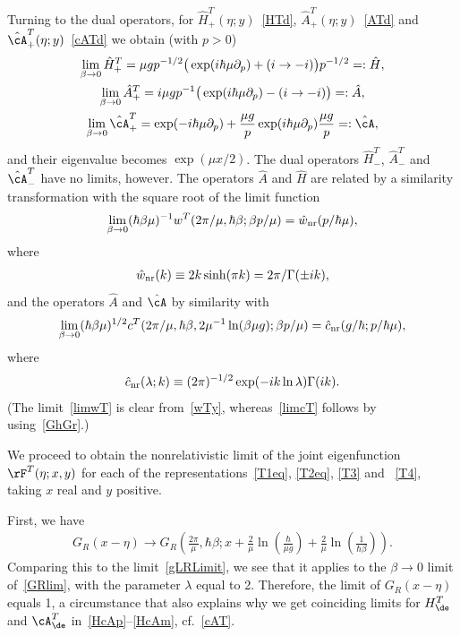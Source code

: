 \documentclass[pdftex]{sigma}
\numberwithin{equation}{section}
\begin{document}
Turning to the dual operators, for $\hat{H}^T_+(\eta;y)$~\eqref{HTd}, $\hat{A}^T_+(\eta;y)$~\eqref{ATd} and~$\hat{\cA}^T_+(\eta;y)$~\eqref{cATd} we obtain (with $p>0$)
\begin{gather}
\lim_{\beta\to 0}\hat{H}^T_+=\mu gp^{-1/2}\big(\exp(i\hbar \mu\partial_p)+(i\to -i)\big)p^{-1/2}=: \hat{H},
\\
\label{hatA}
\lim_{\beta\to 0}\hat{A}^T_+=i\mu gp^{-1}\big(\exp(i\hbar \mu\partial_p)-(i\to -i)\big)=:\hat{A},
\\
\lim_{\beta\to 0}\hat{\cA}^T_+=\exp(-i\hbar \mu\partial_p)+
\frac{\mu g}{p}
\exp(i\hbar \mu\partial_p)\frac{\mu g}{p}=:\hat{\cA},
\end{gather}
and their eigenvalue becomes $\exp(\mu x/2)$. The dual operators $\hat{H}^T_-$, $\hat{A}^T_-$ and $\hat{\cA}^T_-$ have no limits, however. The operators $\hat{A}$ and $\hat{H}$ are related by a similarity transformation with the square root of the limit function
\begin{gather}\label{limwT}
 \lim_{\beta \to 0}(\hbar\beta\mu)^{-1}w^T(2\pi/\mu,\hbar\beta;\beta p/\mu)= \hat{w}_{\rm nr}(p/\hbar\mu),
 \end{gather}
 where
  \begin{gather}
 \hat{w}_{\rm nr}(k)\equiv 2k\sinh (\pi k)=2\pi/\Gamma(\pm ik),
  \end{gather}
and the operators $\hat{A}$ and $\hat{\cA}$ by similarity with
\begin{gather}\label{limcT}
\lim_{\beta \to 0}(\hbar\beta\mu)^{1/2}c^T(2\pi/\mu,\hbar\beta,2\mu^{-1}\ln(\beta\mu g);\beta p/\mu)= \hat{c}_{\rm nr}(g/\hbar;p/\hbar\mu),
 \end{gather}
where
\begin{gather}
 \hat{c}_{\rm nr}(\lambda;k)\equiv (2\pi)^{-1/2}\exp(-ik\ln \lambda)\Gamma(ik).
   \end{gather}
(The limit~\eqref{limwT} is clear from~\eqref{wTy}, whereas~\eqref{limcT} follows by using~\eqref{GhGr}.)

We proceed to obtain the nonrelativistic limit of the joint eigenfunction $\rF^T(\eta;x,y)$ for each of the representations~\eqref{T1eq}, \eqref{T2eq}, \eqref{T3} and~
\eqref{T4}, taking $x$ real and $y$ positive.

 First, we have
\begin{gather}\label{GRlim}
G_R(x-\eta)\to G_R\left(\frac{2\pi}{\mu},\hbar\beta;x+\frac{2}{\mu}\ln\left(\frac{\hbar}{\mu g}\right)
+\frac{2}{\mu}\ln\left(\frac{1}{\hbar\beta}\right)\right).
\end{gather}
Comparing this to the limit~\eqref{gLRLimit}, we see that it applies to the $\beta\to 0$ limit of~\eqref{GRlim}, with the parameter $\lambda$ equal to 2. Therefore, the limit of $G_R(x-\eta)$ equals 1, a circumstance that also explains why we get coinciding limits for $H_{\de}^T$ and $\cA_{\de}^T$ in~\eqref{HcAp}--\eqref{HcAm}, cf.~\eqref{cAT}.
\end{document}
